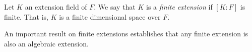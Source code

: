 \documentclass{article}
\begin{document}
Let $K$ an extension field of $F$. We say that $K$ is a \emph{finite extension} if
$[K:F]$ is finite. That is, $K$ is a finite dimensional space over $F$.

An important result on finite extensions establishes that any finite extension is also an algebraic extension.
\end{document}
